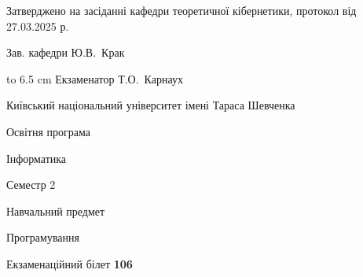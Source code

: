 \documentclass[12pt, ukrainian]{article}
\begin{document}
{\smallskip\smallskip \begin {scriptsize} Затверджено на засіданні кафедри теоретичної кібернетики, протокол   від   27.03.2025 р.\par\smallskip\smallskip\smallskip\smallskip
{\parbox {6.5 cm} {Зав. кафедри \dotfill Ю.В.~Крак}}\hspace {0.7cm} {\hbox to 6.5 cm { Екзаменатор \dotfill Т.О.~Карнаух}} \end{scriptsize}}
\newpage
{{\begin {scriptsize}\par
{ \center  Київський національний університет імені Тараса Шевченка \par}
{\parbox {5 cm}{Освітня програма \hfill}{\parbox {7 cm}{Інформатика\hfill}}\parbox {6 cm}{\hfill Семестр 2}}\par
{\parbox {5 cm} {Навчальний предмет \hfill}\parbox {7 cm}{Програмування \hfill}\parbox {6cm}{\hfill}\par}\vspace{-15pt} \end{scriptsize}}{\center Екзаменаційний білет \No \textbf { 106 }\par}}
\end{document}

